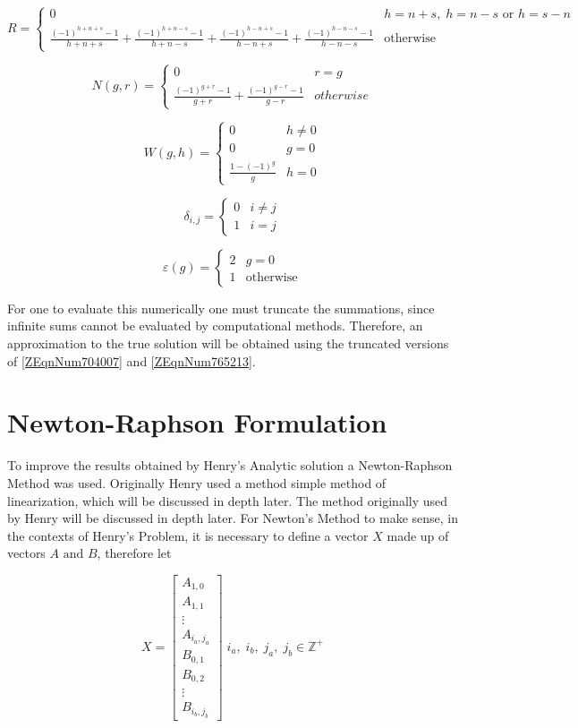 \documentclass{article}
\newcommand{\spbox}[1]{ \text{ #1 }} %
\newcommand{\csp}{, \;} %
\newcommand{\cfunc}[5]{
    #1 = 
    \begin{cases} 
        #2 & #3 \\
        #4 & #5
    \end{cases}
}
\newcommand{\ctfunc}[7]{
    #1 = 
    \begin{cases} 
        #2 & #3 \\
        #4 & #5 \\
        #6 & #7
    \end{cases}
}
\begin{document}
\begin{equation*}
    \cfunc{R}
    {0}
    {h = n + s \csp h = n - s \spbox{or} h = s - n}
    {\frac{\left(-1\right)^{h + n + s} - 1}{h + n + s} +
    \frac{\left(-1\right)^{h + n - s} - 1}{h + n - s} + 
    \frac{\left(-1\right)^{h - n + s} - 1}{h - n + s} + 
    \frac{\left(-1\right)^{h - n - s} - 1}{h - n - s}}
    { \text{otherwise}}  
\end{equation*}

\begin{equation*}
    \cfunc{N\left(g,r\right)}
    {0}
    {r = g}
    {\frac{\left(-1\right)^{g + r} - 1}{g + r} + 
    \frac{\left(-1\right)^{g - r} - 1}{g - r}} 
    {otherwise} 
\end{equation*}

\begin{equation*}
    \ctfunc{W\left(g,h\right)}
    {0}
    {h \ne 0}
    {0}
    {g=0}
    {\frac{1 - \left(-1\right)^{g} }{g} }
    {h = 0}
\end{equation*}

\begin{equation*}
    \cfunc{\delta _{i,j} }
    {0}
    {i \ne j}
    {1}
    {i = j}
\end{equation*}

\begin{equation*}
    \cfunc{\varepsilon \left(g\right)}
    {2}
    {g = 0}
    {1}
    { \text{otherwise}}
\end{equation*}

 For one to evaluate this numerically one must truncate the summations, since
 infinite sums cannot be evaluated by computational methods. Therefore, an
 approximation to the true solution will be obtained using the truncated
 versions of \eqref{ZEqnNum704007} and \eqref{ZEqnNum765213}.

\section{Newton-Raphson Formulation}
 To improve the results obtained by Henry's Analytic solution a Newton-Raphson
 Method was used. Originally Henry used a method simple method of linearization,
 which will be discussed in depth later. The method originally used by Henry
 will be discussed in depth later. For Newton's Method to make sense, in the
 contexts of Henry's Problem, it is necessary to define a vector $X$ made up of
 vectors $A \spbox{and} B$, therefore let

\begin{equation} \label{4.1)} 
    X = \begin{bmatrix}
    A_{1,0} \\ 
    A_{1,1} \\ 
    \vdots \\ 
    A_{i_{a} ,j_{a} } \\ 
    B_{0,1} \\ 
    B_{0,2} \\ 
    \vdots \\
    B_{i_{b} ,j_{b} } \end{bmatrix} \; 
    i_{a} \csp i_{b} \csp j_{a} \csp j_{b} \in \mathbb{Z}^{+} 
\end{equation}
\end{document}
